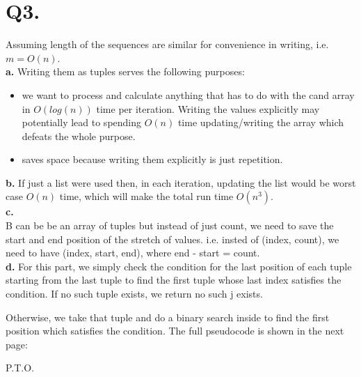 \documentclass[a4paper,11pt]{article}
\begin{document}
\section*{Q3.}
Assuming length of the sequences are similar for convenience in writing, i.e. $m=O(n)$.\\
\textbf{a.}
Writing them as tuples serves the following purposes:
\begin{itemize}
 \item we want to process and calculate anything that has to do with the cand array in $O(log(n))$ time per iteration. Writing the values explicitly may potentially lead to spending $O(n)$ time updating/writing the array which defeats the whole purpose.
  \item saves  space because writing them explicitly is just repetition.
\end{itemize}
\textbf{b.}
If just a list were used then, in each iteration, updating the list would be worst case $O(n)$ time, which will make the total run time $O(n^3)$. \\
\textbf{c.}
\\B can be be an array of tuples but instead of just count, we need to save the start and end position of the stretch of values. i.e. insted of (index, count), we need to have (index, start, end), where end - start = count.\\
\textbf{d.} 
For this part, we simply check the condition for the last position of each tuple starting from the last tuple to find the first tuple whose last index satisfies the condition. If no such tuple exists, we return no such j exists.

Otherwise, we take that tuple and do a binary search inside to find the first position which satisfies the condition. The full pseudocode is shown in the next page:

\begin{center}
 P.T.O.
\end{center}
\end{document}
